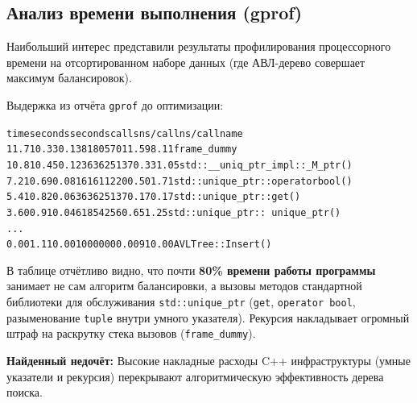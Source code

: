 \subsection*{Анализ времени выполнения (gprof)}
Наибольший интерес представили результаты профилирования процессорного времени на отсортированном наборе данных (где АВЛ-дерево совершает максимум балансировок).

Выдержка из отчёта \texttt{gprof} до оптимизации:
\begin{alltt}
 time   seconds   seconds    calls  ns/call  ns/call  name    
 11.71      0.33     0.13 81805701     1.59     8.11  frame_dummy
 10.81      0.45     0.12 363625137    0.33     1.05  std::__uniq_ptr_impl::_M_ptr()
  7.21      0.69     0.08 161611220    0.50     1.71  std::unique_ptr::operator bool()
  5.41      0.82     0.06 363625137    0.17     0.17  std::unique_ptr::get()
  3.60      0.91     0.04 61854256     0.65     1.25  std::unique_ptr::~unique_ptr()
  ...
  0.00      1.11     0.00  1000000     0.00   910.00  AVLTree::Insert()
\end{alltt}

В таблице отчётливо видно, что почти \textbf{80\% времени работы программы} занимает не сам алгоритм балансировки, а вызовы методов стандартной библиотеки для обслуживания \texttt{std::unique\_ptr} (\texttt{get}, \texttt{operator bool}, разыменование \texttt{tuple} внутри умного указателя). Рекурсия накладывает огромный штраф на раскрутку стека вызовов (\texttt{frame\_dummy}).

\textbf{Найденный недочёт:} Высокие накладные расходы C++ инфраструктуры (умные указатели и рекурсия) перекрывают алгоритмическую эффективность дерева поиска.
\pagebreak